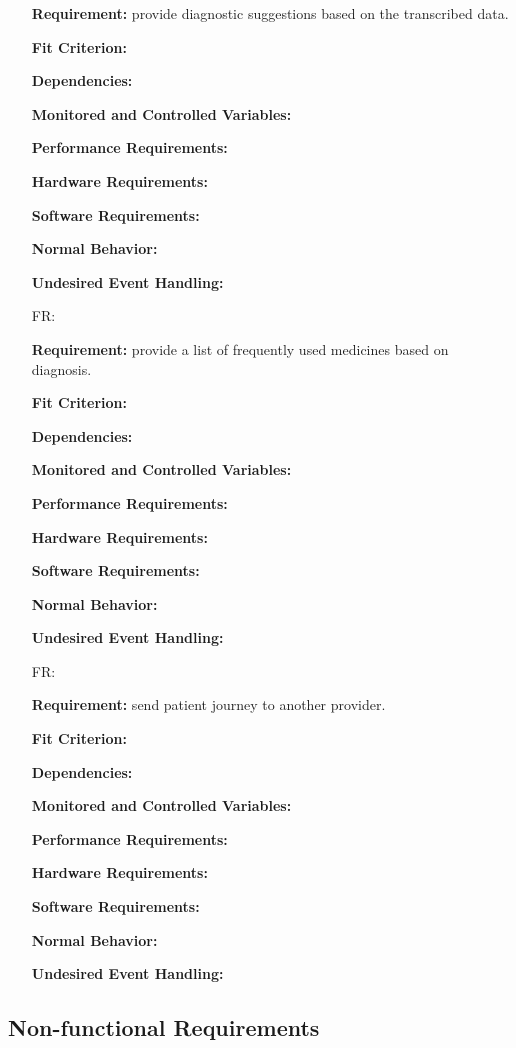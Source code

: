 \documentclass[12pt]{article}
\newcounter{reqnum} %
\begin{document}
\begin{itemize}
\textbf{Requirement:} provide diagnostic suggestions based on the transcribed data.

\textbf{Fit Criterion:}  

\textbf{Dependencies:}  

\textbf{Monitored and Controlled Variables:} 

\textbf{Performance Requirements:} 

\textbf{Hardware Requirements:} 

\textbf{Software Requirements:} 

\textbf{Normal Behavior:} 

\textbf{Undesired Event Handling:} 

\item[FR\refstepcounter{reqnum}\thereqnum \label{FR_meaningfulLabel}:] 

\textbf{Requirement:} provide a list of frequently used medicines based on diagnosis.

\textbf{Fit Criterion:}  

\textbf{Dependencies:}  

\textbf{Monitored and Controlled Variables:} 

\textbf{Performance Requirements:} 

\textbf{Hardware Requirements:} 

\textbf{Software Requirements:} 

\textbf{Normal Behavior:} 

\textbf{Undesired Event Handling:} 

\item[FR\refstepcounter{reqnum}\thereqnum \label{FR_meaningfulLabel}:] 

\textbf{Requirement:} send patient journey to another provider.

\textbf{Fit Criterion:}  

\textbf{Dependencies:}  

\textbf{Monitored and Controlled Variables:} 

\textbf{Performance Requirements:} 

\textbf{Hardware Requirements:} 

\textbf{Software Requirements:} 

\textbf{Normal Behavior:} 

\textbf{Undesired Event Handling:} 

\end{itemize}


\subsection{Non-functional Requirements} \label{sec_NonFunctionalRequirements}
\end{document}

